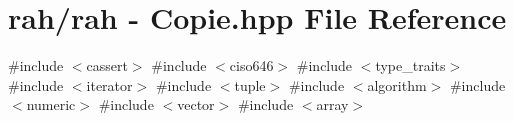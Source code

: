 \hypertarget{rah_01-_01_copie_8hpp}{}\section{rah/rah -\/ Copie.\+hpp File Reference}
\label{rah_01-_01_copie_8hpp}
{\ttfamily \#include $<$cassert$>$}\newline
{\ttfamily \#include $<$ciso646$>$}\newline
{\ttfamily \#include $<$type\+\_\+traits$>$}\newline
{\ttfamily \#include $<$iterator$>$}\newline
{\ttfamily \#include $<$tuple$>$}\newline
{\ttfamily \#include $<$algorithm$>$}\newline
{\ttfamily \#include $<$numeric$>$}\newline
{\ttfamily \#include $<$vector$>$}\newline
{\ttfamily \#include $<$array$>$}\newline
